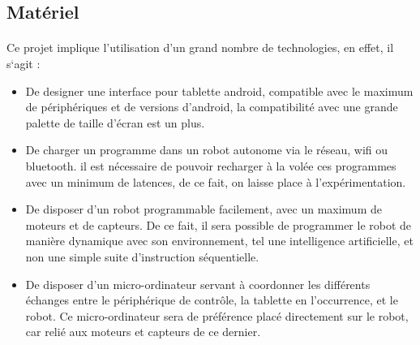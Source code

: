 \documentclass[a4paper]{article}
\begin{document}
\subsection{Matériel}

\paragraph{}
Ce projet implique l’utilisation d’un grand nombre de technologies, en effet, il s‘agit :
\begin{itemize}
\item De designer une interface pour tablette android, compatible avec le maximum de périphériques et de versions d’android, la compatibilité avec une grande palette de taille d’écran est un plus.
\item De charger un programme dans un robot autonome via le réseau, wifi ou bluetooth. il est nécessaire de pouvoir recharger à la volée ces programmes avec un minimum de latences, de ce fait, on laisse place à l’expérimentation.
\item De disposer d’un robot programmable facilement, avec un maximum de moteurs et de capteurs. De ce fait, il sera possible de programmer le robot de manière dynamique avec son environnement, tel une intelligence artificielle, et non une simple suite d’instruction séquentielle.
\item De disposer d’un micro-ordinateur servant à coordonner les différents échanges entre le périphérique de contrôle, la tablette en l'occurrence, et le robot. Ce micro-ordinateur sera de préférence placé directement sur le robot, car relié aux moteurs et capteurs de ce dernier.
\end{itemize}
\end{document}

